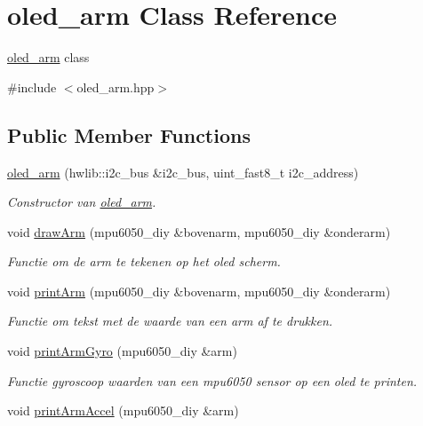 \hypertarget{classoled__arm}{}\section{oled\+\_\+arm Class Reference}
\label{classoled__arm}


\hyperlink{classoled__arm}{oled\+\_\+arm} class  




{\ttfamily \#include $<$oled\+\_\+arm.\+hpp$>$}

\subsection*{Public Member Functions}
\begin{DoxyCompactItemize}
\item 
\hyperlink{classoled__arm_a0d1436ad9431a1778767beef0510c908}{oled\+\_\+arm} (hwlib\+::i2c\+\_\+bus \&i2c\+\_\+bus, uint\+\_\+fast8\+\_\+t i2c\+\_\+address)
\begin{DoxyCompactList}\small\item\em Constructor van \hyperlink{classoled__arm}{oled\+\_\+arm}. \end{DoxyCompactList}\item 
void \hyperlink{classoled__arm_a5d43e95edefb6f7fc363f4da8d1c3b1e}{draw\+Arm} (mpu6050\+\_\+diy \&bovenarm, mpu6050\+\_\+diy \&onderarm)
\begin{DoxyCompactList}\small\item\em Functie om de arm te tekenen op het oled scherm. \end{DoxyCompactList}\item 
void \hyperlink{classoled__arm_a1703c08a80dd80a30fdaad12694af74f}{print\+Arm} (mpu6050\+\_\+diy \&bovenarm, mpu6050\+\_\+diy \&onderarm)
\begin{DoxyCompactList}\small\item\em Functie om tekst met de waarde van een arm af te drukken. \end{DoxyCompactList}\item 
void \hyperlink{classoled__arm_a35bcedc3e023c1744420fdc377ca980c}{print\+Arm\+Gyro} (mpu6050\+\_\+diy \&arm)
\begin{DoxyCompactList}\small\item\em Functie gyroscoop waarden van een mpu6050 sensor op een oled te printen. \end{DoxyCompactList}\item 
void \hyperlink{classoled__arm_ae5eecd55d90a5c6137bfc4cef0cbcb2f}{print\+Arm\+Accel} (mpu6050\+\_\+diy \&arm)

\end{DoxyCompactItemize}
